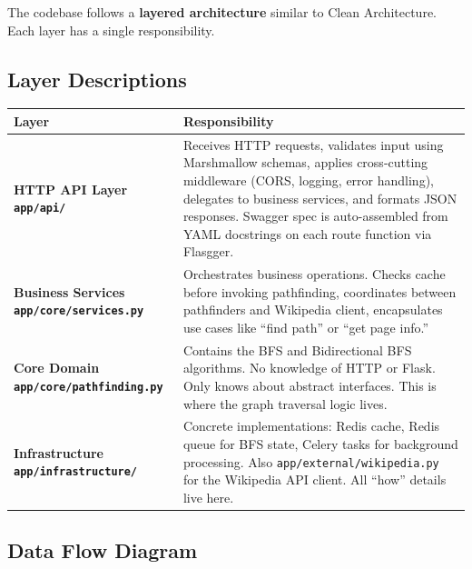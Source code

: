 \documentclass[11pt,a4paper]{article}
\begin{document}
The codebase follows a \textbf{layered architecture} similar to Clean Architecture. Each layer has a single responsibility.

\subsection{Layer Descriptions}

\begin{tabularx}{\textwidth}{@{}>{\bfseries}l X@{}}
\toprule
Layer & Responsibility \\
\midrule
HTTP API Layer \newline \footnotesize\texttt{app/api/} &
Receives HTTP requests, validates input using Marshmallow schemas, applies cross-cutting middleware (CORS, logging, error handling), delegates to business services, and formats JSON responses. Swagger spec is auto-assembled from YAML docstrings on each route function via Flasgger. \\
\addlinespace[0.5em]
Business Services \newline \footnotesize\texttt{app/core/services.py} &
Orchestrates business operations. Checks cache before invoking pathfinding, coordinates between pathfinders and Wikipedia client, encapsulates use cases like ``find path'' or ``get page info.'' \\
\addlinespace[0.5em]
Core Domain \newline \footnotesize\texttt{app/core/pathfinding.py} &
Contains the BFS and Bidirectional BFS algorithms. No knowledge of HTTP or Flask. Only knows about abstract interfaces. This is where the graph traversal logic lives. \\
\addlinespace[0.5em]
Infrastructure \newline \footnotesize\texttt{app/infrastructure/} &
Concrete implementations: Redis cache, Redis queue for BFS state, Celery tasks for background processing. Also \texttt{app/external/wikipedia.py} for the Wikipedia API client. All ``how'' details live here. \\
\bottomrule
\end{tabularx}

\subsection{Data Flow Diagram}
\end{document}
